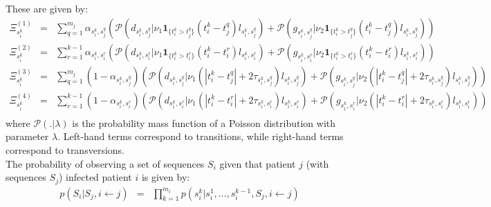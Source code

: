 \documentclass[10pt]{article}
\begin{document}
These are given by:
\begin{eqnarray*}
\Xi_{s_i^k}^{(1)} & = & \sum_{q=1}^{m_j} \alpha_{s_i^k,s_j^q} \left(\mathcal{P}\left(d_{s_i^k,s_j^q} | \nu_1 \mathbf{1}_{\{t_i^k > t_j^q\}}(t_i^k - t_j^q) l_{s_i^k,s_j^q}\right)
+ \mathcal{P}\left(g_{s_i^k,s_j^q} | \nu_2 \mathbf{1}_{\{t_i^k > t_j^q\}}(t_i^k - t_j^q) l_{s_i^k,s_j^q}\right) \right) \\
\Xi_{s_i^k}^{(2)} & = & \sum_{r=1}^{k-1} \alpha_{s_i^k,s_i^r} \left(\mathcal{P}\left(d_{s_i^k,s_i^r} | \nu_1 \mathbf{1}_{\{t_i^k > t_i^r\}}(t_i^k - t_i^r) l_{s_i^k,s_i^r}\right)
+ \mathcal{P}\left(g_{s_i^k,s_i^r} | \nu_2 \mathbf{1}_{\{t_i^k > t_i^r\}}(t_i^k - t_i^r) l_{s_i^k,s_i^r}\right) \right) \\
\Xi_{s_i^k}^{(3)} & = & \sum_{q=1}^{m_j} (1-\alpha_{s_i^k,s_j^q}) \left(\mathcal{P}\left(d_{s_i^k,s_j^q} | \nu_1 (|t_i^k - t_j^q| + 2\tau_{s_i^k,s_j^q}) l_{s_i^k,s_j^q}\right)
+ \mathcal{P}\left(g_{s_i^k,s_j^q} | \nu_2 (|t_i^k - t_j^q| + 2\tau_{s_i^k,s_j^q}) l_{s_i^k,s_j^q}\right) \right) \\
\Xi_{s_i^k}^{(4)} & = & \sum_{r=1}^{k-1} (1-\alpha_{s_i^k,s_i^r}) \left(\mathcal{P}\left(d_{s_i^k,s_i^r} | \nu_1 (|t_i^k - t_i^r| + 2\tau_{s_i^k,s_i^r}) l_{s_i^k,s_i^r}\right)
+ \mathcal{P}\left(g_{s_i^k,s_i^r} | \nu_2 (|t_i^k - t_i^r| + 2\tau_{s_i^k,s_i^r}) l_{s_i^k,s_i^r}\right) \right)\\
\end{eqnarray*}
where $\mathcal{P}(.|\lambda)$ is the probability mass function of a Poisson distribution with parameter $\lambda$. Left-hand terms correspond to transitions, while right-hand terms correspond to transversions.
\\

The probability of observing a set of sequences $S_i$ given that patient $j$ (with sequences $S_j$) infected patient $i$ is given by:
\begin{eqnarray*}
p(S_i | S_j, i \leftarrow j) & = & \prod_{k=1}^{m_i} p(s_i^k | s_i^1, \ldots, s_i^{k-1}, S_j, i \leftarrow j) \\
\end{eqnarray*}
\\

\end{document}
